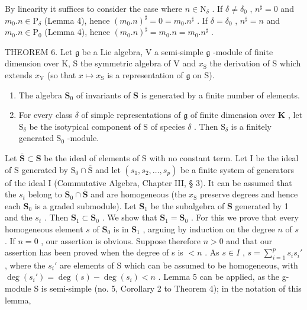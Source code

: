 By linearity it suffices to consider the case where \(n \in \mathrm{N}_{\delta}\) . If \(\delta \neq \delta_0\) , \(n^{\sharp} = 0\) and \(m_0.n \in \mathrm{P}_{\delta}\) (Lemma 4), hence \((m_0.n)^{\sharp} = 0 = m_0.n^{\sharp}\) . If \(\delta = \delta_0\) , \(n^{\sharp} = n\) and \(m_0.n \in \mathrm{P}_0\) (Lemma 4), hence \((m_0.n)^{\sharp} = m_0.n = m_0.n^{\sharp}\) .

THEOREM 6. Let \(\mathfrak{g}\) be a Lie algebra, V a semi-simple \(\mathfrak{g}\) -module of finite dimension over K, S the symmetric algebra of V and \(x_{\mathrm{S}}\) the derivation of S which extends \(x_{\mathrm{V}}\) (so that \(x \mapsto x_{\mathrm{S}}\) is a representation of \(\mathfrak{g}\) on S).

\begin{enumerate}
\def\labelenumi{(\alph{enumi})}
\item
  The algebra \(\mathbf{S}_0\) of invariants of \(\mathbf{S}\) is generated by a finite number of elements.
\item
  For every class \(\delta\) of simple representations of \(\mathfrak{g}\) of finite dimension over \(\mathbf{K}\) , let \(\mathrm{S}_{\delta}\) be the isotypical component of \(\mathrm{S}\) of species \(\delta\) . Then \(\mathrm{S}_{\delta}\) is a finitely generated \(\mathrm{S}_{0}\) -module.
\end{enumerate}

Let \(\overline{\mathbf{S}}\subset \mathbf{S}\) be the ideal of elements of S with no constant term. Let I be the ideal of S generated by \(\mathrm{S}_0\cap \overline{\mathrm{S}}\) and let \((s_1,s_2,\ldots ,s_p)\) be a finite system of generators of the ideal I (Commutative Algebra, Chapter III, § 3). It can be assumed that the \(s_t\) belong to \(\mathbf{S}_0 \cap \bar{\mathbf{S}}\) and are homogeneous (the \(x_{\mathrm{S}}\) preserve degrees and hence each \(\mathbf{S}_0\) is a graded submodule). Let \(\mathbf{S}_1\) be the subalgebra of \(\mathbf{S}\) generated by 1 and the \(s_t\) . Then \(\mathbf{S}_1 \subset \mathbf{S}_0\) . We show that \(\mathbf{S}_1 = \mathbf{S}_0\) . For this we prove that every homogeneous element \(s\) of \(\mathbf{S}_0\) is in \(\mathbf{S}_1\) , arguing by induction on the degree \(n\) of \(s\) . If \(n = 0\) , our assertion is obvious. Suppose therefore \(n > 0\) and that our assertion has been proved when the degree of s is \(< n\) . As \(s \in I\) , \(s = \sum_{i=1}^{p} s_i s_i'\) , where the \(s_i'\) are elements of S which can be assumed to be homogeneous, with \(\deg(s_i') = \deg(s) - \deg(s_i) < n\) . Lemma 5 can be applied, as the g-module S is semi-simple (no. 5, Corollary 2 to Theorem 4); in the notation of this lemma,

